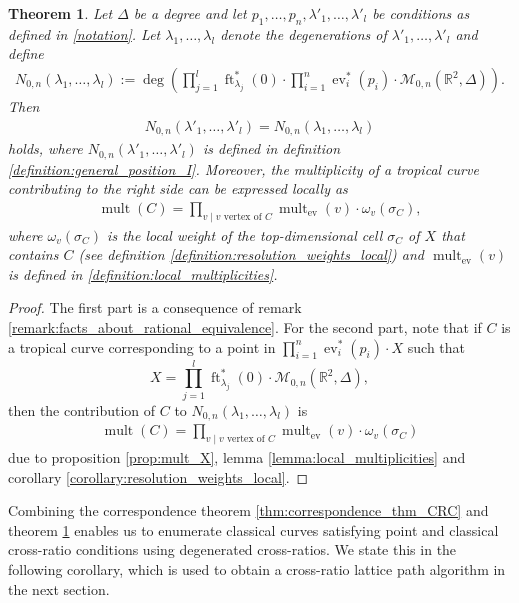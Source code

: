 \documentclass[11pt,reqno,a4]{amsart}
\theoremstyle{dotless}
\newtheorem{theorem}[corollary]{Theorem}
\theoremstyle{definition}
\newcommand{\mult}{\operatorname{mult}}
\newcommand{\ft}{\operatorname{ft}}
\newcommand{\ev}{\operatorname{ev}}
\newcommand{\degree}{\operatorname{deg}}
\begin{document}
\begin{theorem}\label{thm:ZSFSSG_section_2}
Let $\Delta$ be a degree and let $p_1,\dots,p_n,\lambda'_1,\dots,\lambda'_l$ be conditions as defined in \ref{notation}. Let $\lambda_1,\dots,\lambda_{l}$ denote the degenerations of $\lambda'_1,\dots,\lambda'_{l}$ and define
\begin{align*}
N_{0,n}\left(\lambda_1,\dots,\lambda_l\right):=
\degree\left(\prod_{j=1}^{l}\ft_{\lambda_j}^*\left( 0\right)\cdot\prod_{i=1}^n\ev_i^*\left( p_i\right)\cdot\mathcal{M}_{0,n}\left(\mathbb{R}^2,\Delta\right)\right).
\end{align*} 
Then
\begin{align*}
N_{0,n}\left(\lambda'_1,\dots,\lambda'_l\right)
=
N_{0,n}\left(\lambda_1,\dots,\lambda_l\right)
\end{align*}
holds, where $N_{0,n}\left(\lambda'_1,\dots,\lambda'_l\right)$ is defined in definition \ref{definition:general_position_I}. Moreover, the multiplicity of a tropical curve contributing to the right side can be expressed locally as
\begin{align*}
\mult(C)=\prod_{v\mid v \textrm{ vertex of }C}\mult_{\ev}(v)\cdot \omega_v(\sigma_C),
\end{align*}
where $\omega_v(\sigma_C)$ is the local weight of the top-dimensional cell $\sigma_C$ of $X$ that contains $C$ (see definition \ref{definition:resolution_weights_local}) and $\mult_{\ev}(v)$ is defined in \ref{definition:local_multiplicities}.
\end{theorem}

\begin{proof}
The first part is a consequence of remark \ref{remark:facts_about_rational_equivalence}. For the second part, note that if $C$ is a tropical curve corresponding to a point in $\prod_{i=1}^n\ev_i^*\left( p_i\right)\cdot X$ such that 
$$X=\prod_{j=1}^{l}\ft_{\lambda_j}^*\left( 0\right)\cdot \mathcal{M}_{0,n}\left(\mathbb{R}^2,\Delta \right),$$
then the contribution of $C$ to $N_{0,n}\left(\lambda_1,\dots,\lambda_l\right)$ is
\begin{align*}
\mult(C)=\prod_{v\mid v \textrm{ vertex of }C}\mult_{\ev}(v)\cdot \omega_v(\sigma_C)
\end{align*}
due to proposition \ref{prop:mult_X}, lemma \ref{lemma:local_multiplicities} and corollary \ref{corollary:resolution_weights_local}.
\end{proof}

Combining the correspondence theorem \ref{thm:correspondence_thm_CRC} and theorem \ref{thm:ZSFSSG_section_2} enables us to enumerate classical curves satisfying point and classical cross-ratio conditions using degenerated cross-ratios. We state this in the following corollary, which is used to obtain a cross-ratio lattice path algorithm in the next section.
\end{document}
